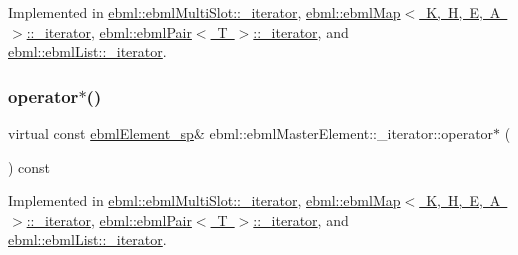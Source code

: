 Implemented in \mbox{\hyperlink{classebml_1_1ebmlMultiSlot_1_1__iterator_a250650c2080db120a29383e5f588feeb}{ebml\+::ebml\+Multi\+Slot\+::\+\_\+iterator}}, \mbox{\hyperlink{classebml_1_1ebmlMap_1_1__iterator_a42189d25979dab96126d411ab83a3849}{ebml\+::ebml\+Map$<$ K, H, E, A $>$\+::\+\_\+iterator}}, \mbox{\hyperlink{classebml_1_1ebmlPair_1_1__iterator_a110f4b90bc4234c0e8f78160126e9baa}{ebml\+::ebml\+Pair$<$ T $>$\+::\+\_\+iterator}}, and \mbox{\hyperlink{classebml_1_1ebmlList_1_1__iterator_af9980e46a983daefa5bd596e88047304}{ebml\+::ebml\+List\+::\+\_\+iterator}}.

\mbox{\label{classebml_1_1ebmlMasterElement_1_1__iterator_a3275ab5cdba37d79dd323879598f4f5d}} 
\subsubsection{\texorpdfstring{operator$\ast$()}{operator*()}}
{\footnotesize\ttfamily virtual const \mbox{\hyperlink{namespaceebml_adad533b7705a16bb360fe56380c5e7be}{ebml\+Element\+\_\+sp}}\& ebml\+::ebml\+Master\+Element\+::\+\_\+iterator\+::operator$\ast$ (\begin{DoxyParamCaption}{ }\end{DoxyParamCaption}) const\hspace{0.3cm}{\ttfamily [pure virtual]}}



Implemented in \mbox{\hyperlink{classebml_1_1ebmlMultiSlot_1_1__iterator_a3baa39c32ce95c538e8fee957d683e50}{ebml\+::ebml\+Multi\+Slot\+::\+\_\+iterator}}, \mbox{\hyperlink{classebml_1_1ebmlMap_1_1__iterator_aedbcdd2c78b42961a1f7478fec5080a4}{ebml\+::ebml\+Map$<$ K, H, E, A $>$\+::\+\_\+iterator}}, \mbox{\hyperlink{classebml_1_1ebmlPair_1_1__iterator_ae7f85d6a25b93280837766d206574604}{ebml\+::ebml\+Pair$<$ T $>$\+::\+\_\+iterator}}, and \mbox{\hyperlink{classebml_1_1ebmlList_1_1__iterator_a2fc500e854171e07d1b0e3ca9ea48fb0}{ebml\+::ebml\+List\+::\+\_\+iterator}}.

\mbox{\label{classebml_1_1ebmlMasterElement_1_1__iterator_ab77210fd0e481e1bb5b8563f7bd8142b}} 
